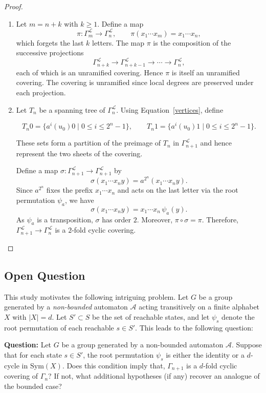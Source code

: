 \documentclass{article}
\newcommand{\A}{\mathcal{A}}
\renewcommand{\L}{\mathcal{L}}
\newcommand{\G}{\Gamma}
\begin{document}
\begin{proof}
\begin{enumerate}
  \item
  Let $m=n+k$ with $k\ge1$. Define a map
  $$\pi:\G_m^{\L}\longrightarrow \G_n^{\L}, \qquad
  \pi(x_1\cdots x_m)=x_1\cdots x_n,$$
  which forgets the last $k$ letters.
  The map $\pi$ is the composition of the successive projections
 $$ \G_{n+k}^{\L}\to \G_{n+k-1}^{\L}\to \cdots \to \G_n^{\L},$$
  each of which is an unramified covering. Hence $\pi$ is itself an unramified covering.
  The covering is unramified since local degrees are preserved under each projection.

  \item
  Let $T_n$ be a spanning tree of $\G_n^{\L}$. Using Equation~\eqref{vertices}, define
  
  $$T_n0=\{a^i(u_0)0 \mid 0\le i\le 2^n-1\}, \qquad
  T_n1=\{a^i(u_0)1 \mid 0\le i\le 2^n-1\}.$$
  
  These sets form a partition of the preimage of $T_n$ in $\G_{n+1}^{\L}$ and hence
  represent the two sheets of the covering.

  Define a map $\sigma:\G_{n+1}^{\L}\to \G_{n+1}^{\L}$ by
  $$ \sigma(x_1\cdots x_n y)=a^{2^n}(x_1\cdots x_n y).$$
  Since $a^{2^n}$ fixes the prefix $x_1\cdots x_n$ and acts on the last letter via the
  root permutation $\psi_a$, we have
 $$ \sigma(x_1\cdots x_n y)=x_1\cdots x_n\,\psi_a(y).$$
  As $\psi_a$ is a transposition, $\sigma$ has order $2$. Moreover,
  $\pi\circ\sigma=\pi$. Therefore, $\G_{n+1}^{\L}\to\G_n^{\L}$ is a $2$-fold cyclic covering.
\end{enumerate}
\end{proof}

\subsection{Open Question}

This study motivates the following intriguing problem. Let $G$ be a group generated by a \emph{non-bounded} automaton $\A$ acting transitively on a finite alphabet $X$ with $|X| = d$. Let $S' \subset S$ be the set of reachable states, and let $\psi_s$ denote the root permutation of each reachable $s \in S'$. This leads to the following question:

\medskip
\noindent
{\bf Question:}  
Let $G$ be a group generated by a non-bounded automaton $\A$. Suppose that for each state $s \in S'$, the root permutation $\psi_s$ is either the identity or a $d$-cycle in $\mathrm{Sym}(X)$.  
Does this condition imply that, $\G_{n+1}$ is a $d$-fold cyclic covering of $\G_n$?  
If not, what additional hypotheses (if any) recover an analogue of the bounded case?
\end{document}
